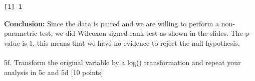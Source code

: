 \documentclass[
  letterpaper,
  DIV=11,
  numbers=noendperiod]{scrartcl}
\makeatletter
\let\oldparagraph\paragraph
\renewcommand{\paragraph}{
    \@ifstar
      \xxxParagraphStar
      \xxxParagraphNoStar
  }
\newcommand{\xxxParagraphStar}[1]{\oldparagraph*{#1}\mbox{}}
\newcommand{\xxxParagraphNoStar}[1]{\oldparagraph{#1}\mbox{}}
\newenvironment{Shaded}{\begin{snugshade}}{\end{snugshade}}
\newcommand{\CommentTok}[1]{\textcolor[rgb]{0.37,0.37,0.37}{#1}}
\newcommand{\DecValTok}[1]{\textcolor[rgb]{0.68,0.00,0.00}{#1}}
\newcommand{\FloatTok}[1]{\textcolor[rgb]{0.68,0.00,0.00}{#1}}
\newcommand{\FunctionTok}[1]{\textcolor[rgb]{0.28,0.35,0.67}{#1}}
\newcommand{\NormalTok}[1]{\textcolor[rgb]{0.00,0.23,0.31}{#1}}
\newcommand{\OtherTok}[1]{\textcolor[rgb]{0.00,0.23,0.31}{#1}}
\newcommand{\SpecialCharTok}[1]{\textcolor[rgb]{0.37,0.37,0.37}{#1}}
\makeatother
\begin{document}
\begin{verbatim}
[1] 1
\end{verbatim}

\textbf{Conclusion:} Since the data is paired and we are willing to
perform a non-parametric test, we did Wilcoxon signed rank test as shown
in the slides. The p-value is 1, this means that we have no evidence to
reject the null hypothesis.

\paragraph{5f. Transform the original variable by a log() transformation
and repeat your analysis in 5c and 5d {[}10
points{]}}\label{f.-transform-the-original-variable-by-a-log-transformation-and-repeat-your-analysis-in-5c-and-5d-10-points}

\begin{Shaded}
\end{Shaded}
\end{document}
